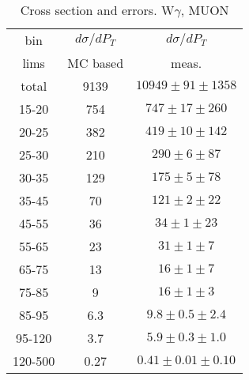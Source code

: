 \begin{table}[h]
  \scriptsize
  \begin{center}
  \caption{Cross section and errors. W$\gamma$, MUON}
  \begin{tabular}{|c|c|c|}
    bin & $d\sigma/dP_{T}$ &$d\sigma/dP_{T}$ \\ 
    lims & MC based &    meas.       \\ \hline
    total & 9139 & $10949 \pm 91 \pm 1358$ \\ \hline
    15-20 & 754 & $747 \pm 17 \pm 260$ \\ \hline
    20-25 & 382 & $419 \pm 10 \pm 142$ \\ \hline
    25-30 & 210 & $290 \pm 6 \pm 87$ \\ \hline
    30-35 & 129 & $175 \pm 5 \pm 78$ \\ \hline
    35-45 & 70 & $121 \pm 2 \pm 22$ \\ \hline
    45-55 & 36 & $34 \pm 1 \pm 23$ \\ \hline
    55-65 & 23 & $31 \pm 1 \pm 7$ \\ \hline
    65-75 & 13 & $16 \pm 1 \pm 7$ \\ \hline
    75-85 & 9 & $16 \pm 1 \pm 3$ \\ \hline
    85-95 & 6.3 & $9.8 \pm 0.5 \pm 2.4$ \\ \hline
    95-120 & 3.7 & $5.9 \pm 0.3 \pm 1.0$ \\ \hline
    120-500 & 0.27 & $0.41 \pm 0.01 \pm 0.10$ \\ \hline
  \end{tabular}
  \label{tab:sc_mc_vs_meas_MUON_WGamma}
  \end{center}
\end{table}

